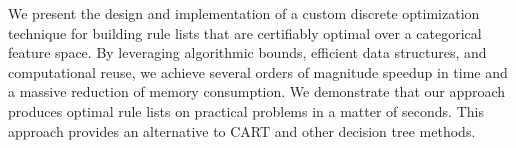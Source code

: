 We present the design and implementation of a custom discrete optimization technique for building rule lists that
are certifiably optimal over a categorical feature space.
%
By leveraging algorithmic bounds, efficient data structures, and computational
reuse,
we achieve several orders of magnitude speedup in time
and a massive reduction of memory consumption.
%
We demonstrate that our approach produces optimal rule lists on practical
problems in a matter of seconds.
%
This approach provides an alternative to CART and other decision tree methods.
